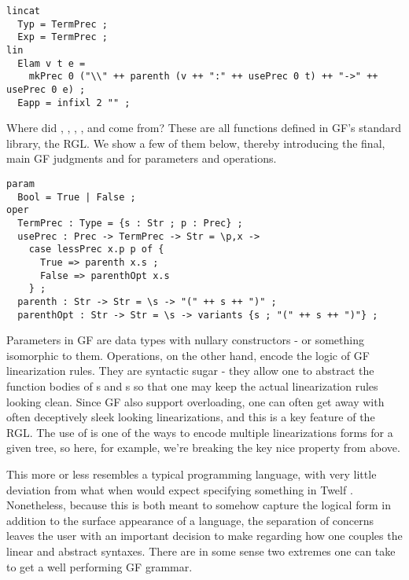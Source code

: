 \begin{verbatim}
lincat
  Typ = TermPrec ;
  Exp = TermPrec ;
lin
  Elam v t e = 
    mkPrec 0 ("\\" ++ parenth (v ++ ":" ++ usePrec 0 t) ++ "->" ++ usePrec 0 e) ;
  Eapp = infixl 2 "" ;
\end{verbatim}

Where did , , ,
, and  come from? These are all functions
defined in GF's standard library, the RGL. We show a few of them below, thereby
introducing the final, main GF judgments  and  for
parameters and operations.

\begin{verbatim}
param 
  Bool = True | False ;
oper
  TermPrec : Type = {s : Str ; p : Prec} ;
  usePrec : Prec -> TermPrec -> Str = \p,x ->
    case lessPrec x.p p of {
      True => parenth x.s ;
      False => parenthOpt x.s
    } ;
  parenth : Str -> Str = \s -> "(" ++ s ++ ")" ;
  parenthOpt : Str -> Str = \s -> variants {s ; "(" ++ s ++ ")"} ;
\end{verbatim}

Parameters in GF are data types with nullary constructors - or something
isomorphic to them. Operations, on the other hand, encode the logic of GF
linearization rules. They are syntactic sugar - they allow one to abstract the
function bodies of s and s so that one may keep the
actual linearization rules looking clean. Since GF also support 
overloading, one can often get away with often deceptively sleek looking
linearizations, and this is a key feature of the RGL. The use of  is one of the
ways to encode multiple linearizations forms for a given tree, so here, for
example, we're breaking the key nice property from above.

This more or less resembles a typical programming language, with very little
deviation from what when would expect specifying something in Twelf
\cite{twelf}. Nonetheless, because this is both meant to somehow capture the
logical form in addition to the surface appearance of a language, the separation
of concerns leaves the user with an important decision to make regarding how one
couples the linear and abstract syntaxes. There are in some sense two extremes
one can take to get a well performing GF grammar.

